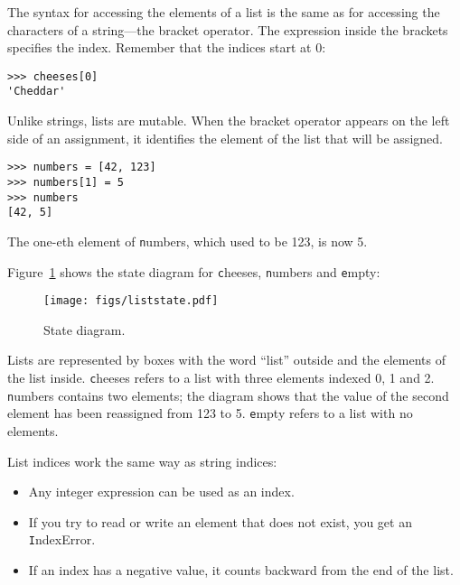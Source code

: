 \documentclass[
DIV=11,
fontsize=12,
twoside,
headinclude=false,
titlepage=firstiscover,
abstract=true,
headsepline=true,
footsepline=true,
chapterprefix=true, %
headings=big,
bibliography=totoc,%
captions=tableheading
]{scrbook}
\theoremstyle{definition}
\begin{document}
The syntax for accessing the elements of a list is the same as for
accessing the characters of a string---the bracket operator.  The
expression inside the brackets specifies the index.  Remember that the
indices start at 0:

\begin{lstlisting}
>>> cheeses[0]
'Cheddar'
\end{lstlisting}
%
Unlike strings, lists are mutable.  When the bracket operator appears
on the left side of an assignment, it identifies the element of the
list that will be assigned.

\begin{lstlisting}
>>> numbers = [42, 123]
>>> numbers[1] = 5
>>> numbers
[42, 5]
\end{lstlisting}
%
The one-eth element of {\texttt numbers}, which
used to be 123, is now 5.

Figure~\ref{fig.liststate} shows 
the state diagram for {\texttt
cheeses}, {\texttt numbers} and {\texttt empty}:

\begin{figure}
\centerline
{\texttt{[image: figs/liststate.pdf]}}
\caption{State diagram.}
\label{fig.liststate}
\end{figure}

Lists are represented by boxes with the word ``list'' outside
and the elements of the list inside.  {\texttt cheeses} refers to
a list with three elements indexed 0, 1 and 2.
{\texttt numbers} contains two elements; the diagram shows that the
value of the second element has been reassigned from 123 to 5.
{\texttt empty} refers to a list with no elements.

List indices work the same way as string indices:

\begin{itemize}

\item Any integer expression can be used as an index.

\item If you try to read or write an element that does not exist, you
get an {\texttt IndexError}.

\item If an index has a negative value, it counts backward from the
end of the list.

\end{itemize}
\end{document}
